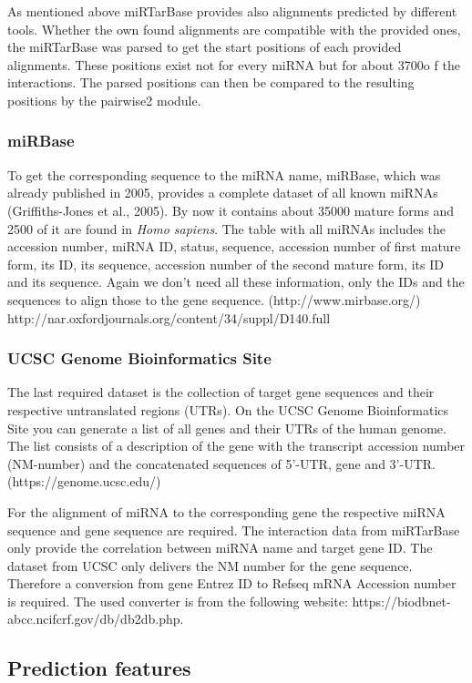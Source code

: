 \documentclass[12pt]{article}
\begin{document}
As mentioned above miRTarBase provides also alignments predicted by different tools. Whether the own found alignments are compatible with the provided ones, the miRTarBase was parsed to get the start positions of each provided alignments. These positions exist not for every miRNA but for about 3700o f the interactions. The parsed positions can then be compared to the resulting positions by the pairwise2 module.

\subsubsection{miRBase}
To get the corresponding sequence to the miRNA name, miRBase, which was already published in 2005, provides a complete dataset of all known miRNAs (Griffiths-Jones et al., 2005). By now it contains about 35000 mature forms and 2500 of it are found in \textit{Homo sapiens}. The table with all miRNAs includes the accession number, miRNA ID, status, sequence, accession number of first mature form, its ID, its sequence, accession number of the second mature form, its ID and its sequence. Again we don't need all these information, only the IDs and the sequences to align those to the gene sequence. (http://www.mirbase.org/) http://nar.oxfordjournals.org/content/34/suppl/D140.full 

\subsubsection{UCSC Genome Bioinformatics Site}
The last required dataset is the collection of target gene sequences and their respective untranslated regions (UTRs). On the UCSC Genome Bioinformatics Site you can generate a list of all genes and their UTRs of the human genome. The list consists of a description of the gene with the transcript accession number (NM-number) and the concatenated sequences of 5'-UTR, gene and 3'-UTR. (https://genome.ucsc.edu/) 

For the alignment of miRNA to the corresponding gene the respective miRNA sequence and gene sequence are required. The interaction data from miRTarBase only provide the correlation between miRNA name and target gene ID. The dataset from UCSC only delivers the NM number for the gene sequence. Therefore a conversion from gene Entrez ID to Refseq mRNA Accession number is required. The used converter is from the following website: https://biodbnet-abcc.ncifcrf.gov/db/db2db.php.
 

\subsection{Prediction features}
\end{document}
